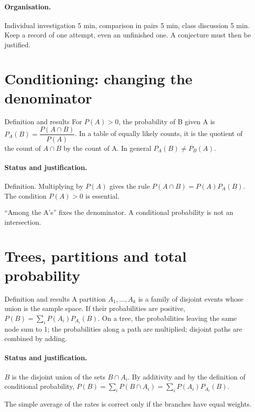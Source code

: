 \paragraph{Organisation.} Individual investigation 5 min, comparison in pairs 5 min, class discussion 5 min. Keep a record of one attempt, even an unfinished one. A conjecture must then be justified.
\section{Conditioning: changing the denominator}\label{C05-U1}
\begin{repere}{Definition and results}
For $P(A)>0$, the probability of B given A is $P_A(B)=\dfrac{P(A\cap B)}{P(A)}$. In a table of equally likely counts, it is the quotient of the count of $A\cap B$ by the count of A. In general $P_A(B)\ne P_B(A)$.
\end{repere}
\paragraph{Status and justification.} Definition. Multiplying by $P(A)$ gives the rule $P(A\cap B)=P(A)P_A(B)$. The condition $P(A)>0$ is essential.
\label{C05-EX1}
\begin{erreur}``Among the A's'' fixes the denominator. A conditional probability is not an intersection.\end{erreur}
\label{C05-AP1}
\section{Trees, partitions and total probability}\label{C05-U2}
\begin{repere}{Definition and results}
A partition $A_1,\ldots,A_k$ is a family of disjoint events whose union is the sample space. If their probabilities are positive, $P(B)=\sum_iP(A_i)P_{A_i}(B)$. On a tree, the probabilities leaving the same node sum to 1; the probabilities along a path are multiplied; disjoint paths are combined by adding.
\end{repere}
\paragraph{Status and justification.} $B$ is the disjoint union of the sets $B\cap A_i$. By additivity and by the definition of conditional probability, $P(B)=\sum_iP(B\cap A_i)=\sum_iP(A_i)P_{A_i}(B)$.
\label{C05-EX2}

\begin{erreur}The simple average of the rates is correct only if the branches have equal weights.\end{erreur}
\label{C05-AP2}
